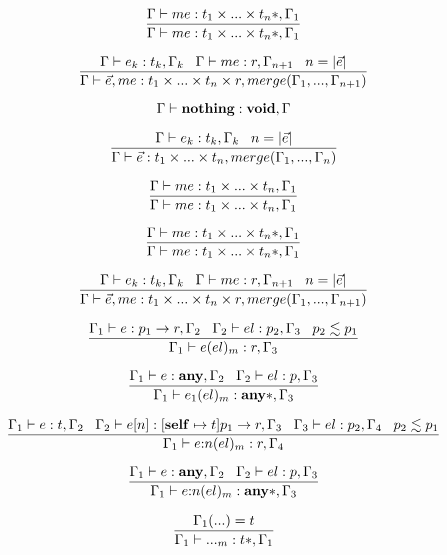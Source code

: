 \[
\dfrac{\Gamma \vdash me:t_{1} \times ... \times t_{n}{*}, \Gamma_{1}}
      {\Gamma \vdash me:t_{1} \times ... \times t_{n}{*}, \Gamma_{1}}
\]

\[
\dfrac{\Gamma \vdash e_{k}:t_{k}, \Gamma_{k} \;\;\;
       \Gamma \vdash me:r, \Gamma_{n + 1} \;\;\;
       n = |\vec{e}|}
      {\Gamma \vdash \vec{e}, me:t_{1} \times ... \times t_{n} \times r, merge(\Gamma_{1}, ..., \Gamma_{n+1})}
\]

\[
\Gamma \vdash \mathbf{nothing}:\mathbf{void}, \Gamma
\]

\[
\dfrac{\Gamma \vdash e_{k}:t_{k}, \Gamma_{k} \;\;\;
       n = |\vec{e}|}
      {\Gamma \vdash \vec{e}:t_{1} \times ... \times t_{n}, merge(\Gamma_{1}, ..., \Gamma_{n})}
\]

\[
\dfrac{\Gamma \vdash me:t_{1} \times ... \times t_{n}, \Gamma_{1}}
      {\Gamma \vdash me:t_{1} \times ... \times t_{n}, \Gamma_{1}}
\]

\[
\dfrac{\Gamma \vdash me:t_{1} \times ... \times t_{n}{*}, \Gamma_{1}}
      {\Gamma \vdash me:t_{1} \times ... \times t_{n}{*}, \Gamma_{1}}
\]

\[
\dfrac{\Gamma \vdash e_{k}:t_{k}, \Gamma_{k} \;\;\;
       \Gamma \vdash me:r, \Gamma_{n + 1} \;\;\;
       n = |\vec{e}|}
      {\Gamma \vdash \vec{e}, me:t_{1} \times ... \times t_{n} \times r, merge(\Gamma_{1}, ..., \Gamma_{n+1})}
\]

\[
\dfrac{\Gamma_{1} \vdash e:p_{1} \rightarrow r, \Gamma_{2} \;\;\;
       \Gamma_{2} \vdash el:p_{2}, \Gamma_{3} \;\;\;
       p_{2} \lesssim p_{1}}
      {\Gamma_{1} \vdash e(el)_{m}:r, \Gamma_{3}}
\]

\[
\dfrac{\Gamma_{1} \vdash e:\mathbf{any}, \Gamma_{2} \;\;\;
       \Gamma_{2} \vdash el:p, \Gamma_{3}}
      {\Gamma_{1} \vdash e_{1}(el)_{m}:\mathbf{any}{*}, \Gamma_{3}}
\]

\[
\dfrac{\Gamma_{1} \vdash e:t, \Gamma_{2} \;\;\;
       \Gamma_{2} \vdash e[n]:[\mathbf{self} \mapsto t]p_{1} \rightarrow r, \Gamma_{3} \;\;\;
       \Gamma_{3} \vdash el:p_{2}, \Gamma_{4} \;\;\;
       p_{2} \lesssim p_{1}}
      {\Gamma_{1} \vdash e{:}n(el)_{m}:r, \Gamma_{4}}
\]

\[
\dfrac{\Gamma_{1} \vdash e:\mathbf{any}, \Gamma_{2} \;\;\;
       \Gamma_{2} \vdash el:p, \Gamma_{3}}
      {\Gamma_{1} \vdash e{:}n(el)_{m}:\mathbf{any}{*}, \Gamma_{3}}
\]

\[
\dfrac{\Gamma_{1}({...}) = t}
      {\Gamma_{1} \vdash {...}_{m}:t{*}, \Gamma_{1}}
\]

